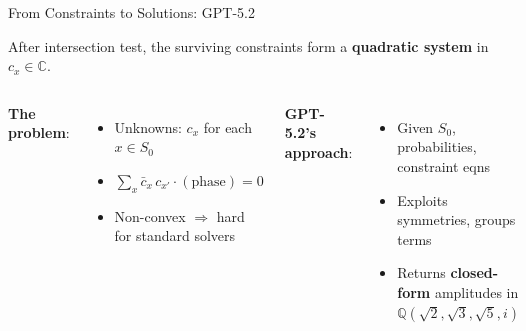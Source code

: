 \documentclass[aspectratio=169,t]{beamer}
\newcommand{\QQ}{\mathbb{Q}}
\newcommand{\CC}{\mathbb{C}}
\newcommand{\code}[1]{\texttt{\small #1}}
\begin{document}
\begin{frame}{From Constraints to Solutions: GPT-5.2}

After intersection test, the surviving constraints form a
\textbf{quadratic system} in $c_x \in \CC$.

\begin{columns}[T]
\textbf{The problem}:
\begin{itemize}\setlength\itemsep{0pt}
\item Unknowns: $c_x$ for each $x \in S_0$
\item $\sum_{x} \bar{c}_x\, c_{x'}\!\cdot\!(\text{phase}) = 0$
\item Non-convex $\Rightarrow$ hard for standard solvers
\end{itemize}

\textbf{GPT-5.2's approach}:
\begin{itemize}\setlength\itemsep{0pt}
\item Given $S_0$, probabilities, constraint eqns
\item Exploits symmetries, groups terms
\item Returns \textbf{closed-form} amplitudes
  in $\QQ(\sqrt{2},\sqrt{3},\sqrt{5},i)$
\end{itemize}
\end{columns}

\vspace{0.2em}
\begin{center}
\end{center}
\end{frame}
\end{document}
